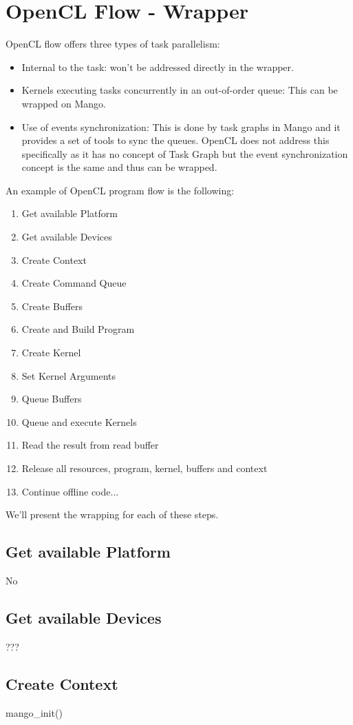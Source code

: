 \documentclass[a4paper]{article}
\begin{document}
\section{OpenCL Flow - Wrapper}
OpenCL flow offers three types of task parallelism: 
\begin{itemize}
	\item Internal to the task: won't be addressed directly in the wrapper.
	\item Kernels executing tasks concurrently in an out-of-order queue: This can be wrapped on Mango.
	\item Use of events synchronization: This is done by task graphs in Mango and it provides a set of tools to sync the queues. OpenCL does not address this specifically as it has no concept of Task Graph but the event synchronization concept is the same and thus can be wrapped.
\end{itemize} 
 An example of OpenCL program flow is the following:
\begin{enumerate}
	\item Get available Platform
        	\item Get available Devices
	\item Create Context
	\item Create Command Queue
	\item Create Buffers
	\item Create and Build Program
	\item Create Kernel
	\item Set Kernel Arguments
	\item Queue Buffers
	\item Queue and execute Kernels
	\item Read the result from read buffer
	\item Release all resources, program, kernel, buffers and context
	\item Continue offline code... 
\end{enumerate}
We'll present the wrapping for each of these steps.

\subsection{Get available Platform}
No
\subsection{Get available Devices}
???
\subsection{Create Context}
\ttfamily mango\_init() \rmfamily
\end{document}
